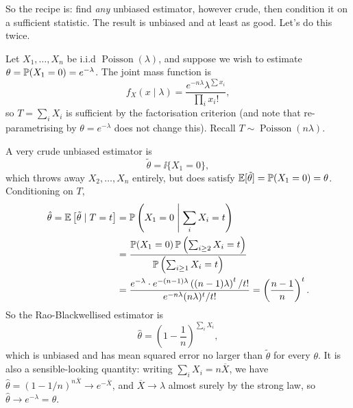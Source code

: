 \documentclass[a4paper]{scrartcl}
\newcommand{\Poisson}{\operatorname{Poisson}}
\begin{document}
So the recipe is: find \emph{any} unbiased estimator, however crude, then condition it on a sufficient statistic. The result is unbiased and at least as good. Let's do this twice.

\begin{example}
  Let $X_1, \dots, X_n$ be i.i.d $\Poisson(\lambda)$, and suppose we wish to estimate $\theta = \mathbb{P}(X_1 = 0) = e^{-\lambda}$. The joint mass function is
  $$
  f_X(x \mid \lambda) = \frac{e^{-n\lambda}\lambda^{\sum x_i}}{\prod_i x_i!},
  $$
  so $T = \sum_i X_i$ is sufficient by the factorisation criterion (and note that re-parametrising by $\theta = e^{-\lambda}$ does not change this). Recall $T \sim \Poisson(n\lambda)$.

  A very crude unbiased estimator is
  $$
  \tilde\theta = \ii\{X_1 = 0\},
  $$
  which throws away $X_2, \dots, X_n$ entirely, but does satisfy $\mathbb{E}[\tilde\theta] = \mathbb{P}(X_1 = 0) = \theta$. Conditioning on $T$,
  \begin{align*}
    \hat\theta = \mathbb{E}\left[\tilde\theta \mid T = t\right] &= \mathbb{P}\left(X_1 = 0 \;\middle|\; \sum_i X_i = t\right)\\
    &= \frac{\mathbb{P}(X_1 = 0)\,\mathbb{P}\left(\sum_{i \geq 2}X_i = t\right)}{\mathbb{P}\left(\sum_{i\geq 1}X_i = t\right)}\\
    &= \frac{e^{-\lambda}\cdot e^{-(n-1)\lambda}\left((n-1)\lambda\right)^t/t!}{e^{-n\lambda}(n\lambda)^t/t!} = \left(\frac{n-1}{n}\right)^t.
  \end{align*}
  So the Rao-Blackwellised estimator is
  $$
  \hat\theta = \left(1 - \frac{1}{n}\right)^{\sum_i X_i},
  $$
  which is unbiased and has mean squared error no larger than $\tilde\theta$ for every $\theta$. It is also a sensible-looking quantity: writing $\sum_i X_i = n\overline{X}$, we have $\hat\theta = (1 - 1/n)^{n\overline{X}} \to e^{-\overline{X}}$, and $\overline{X} \to \lambda$ almost surely by the strong law, so $\hat\theta \to e^{-\lambda} = \theta$.
\end{example}
\end{document}

